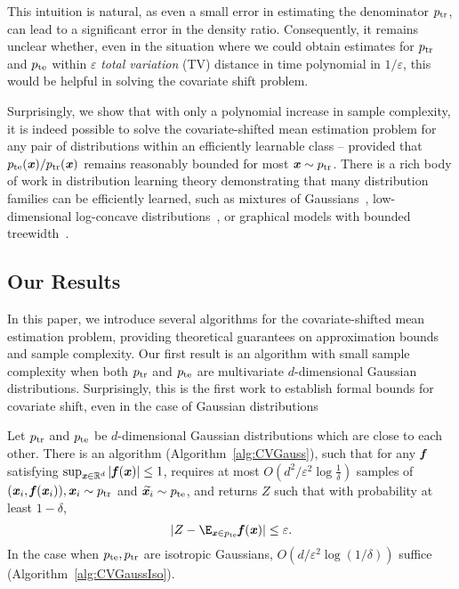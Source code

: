 This intuition is natural, as even a small error in estimating the denominator $p_{\mathrm{tr}}$, can lead to a significant error in the density ratio. Consequently, it remains unclear whether, even in the situation where we could obtain estimates for $p_{\mathrm{tr}}$ and $p_{\mathrm{te}}$ within $\varepsilon$ \emph{total variation} (TV) distance in time polynomial in $1/\varepsilon$, this would be helpful in solving the covariate shift problem.


Surprisingly, we show that with only a polynomial increase in sample complexity, it is indeed possible to solve the covariate-shifted mean estimation problem for any pair of distributions within an efficiently learnable class -- provided that $p_{\mathrm{te}}(\boldsymbol{\mathit{x}})/p_{\mathrm{tr}}(\boldsymbol{\mathit{x}})$ remains reasonably bounded for most $\boldsymbol{\mathit{x}} \sim p_{\mathrm{tr}}$. There is a rich body of work in distribution learning theory demonstrating that many distribution families can be efficiently learned, such as mixtures of Gaussians~\cite{moitra2010settling,liu2022clustering}, low-dimensional log-concave distributions~\cite{diakonikolas2017learning}, or graphical models with bounded treewidth~\cite{narasimhan2004paclearning}.

\subsection{Our Results}

In this paper, we introduce several algorithms for the covariate-shifted mean estimation problem, providing theoretical guarantees on approximation bounds and sample complexity. Our first result is an algorithm with small sample complexity when both $p_{\mathrm{tr}}$ and $p_{\mathrm{te}}$ are multivariate $d$-dimensional Gaussian distributions. Surprisingly, this is the first work to establish formal bounds for covariate shift, even in the case of Gaussian distributions 

\begin{theorem}\label{thm:GaussIntro}
    Let $p_{\mathrm{tr}}$ and $p_{\mathrm{te}}$ be $d$-dimensional Gaussian distributions which are close to each other.  There is an algorithm (Algorithm~\ref{alg:CVGauss}), such that for any $\boldsymbol{\mathit{f}}$ satisfying $\sup_{\boldsymbol{\mathit{x}}\in \mathbb{R}^d}|\boldsymbol{\mathit{f}}(\boldsymbol{\mathit{x}})|\leq 1$,  requires at most $O\left(d^2/\varepsilon^2 \log\frac{1}{\delta}\right)$ samples of $(\boldsymbol{\mathit{x}}_i,\boldsymbol{\mathit{f}}(\boldsymbol{\mathit{x}}_i)), \boldsymbol{\mathit{x}}_i \sim p_{\mathrm{tr}}$ and $\widetilde{\boldsymbol{\mathit{x}}_i}\sim p_{\mathrm{te}}$, and returns $Z$ such that with probability at least $1-\delta$,
\[
|Z-\E_{\xx\in \pte}\ff(\xx)|\leq \varepsilon.
\]
In the case when $p_{\mathrm{te}},p_{\mathrm{tr}}$ are isotropic Gaussians, $O\left(d/\varepsilon^2 \log(1/\delta)\right)$ suffice (Algorithm~\ref{alg:CVGaussIso}).
\end{theorem}


